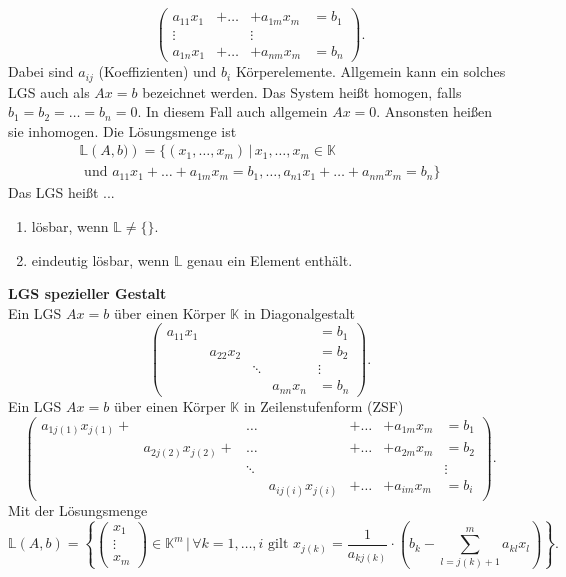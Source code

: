 \documentclass[a4paper,12pt]{article}
\begin{document}
\[ 
        \left(\begin{matrix}
                        a_{11}x_1&+\hdots&+a_{1m}x_m&=b_1\\
                        \vdots&&\vdots\\
                        a_{1n}x_1&+\hdots&+a_{nm}x_m&=b_n
        \end{matrix}\right)
.\] 
Dabei sind $a_{ij}$ (Koeffizienten) und $b_i$ Körperelemente. Allgemein kann ein solches LGS auch als $Ax=b$ bezeichnet werden. Das System heißt homogen, falls $b_1=b_2=\hdots=b_n=0$. In diesem Fall auch allgemein $Ax=0$. Ansonsten heißen sie inhomogen. Die Lösungsmenge ist
\begin{gather*}
        \mathbb{L}\left(A,b)\right)=\{\left(x_1,\hdots,x_m\right)\,|\, x_1,\hdots,x_m \in \mathbb{K}\\\text{ und }a_{11}x_1+\hdots+a_{1m}x_m=b_1,\hdots,a_{n1}x_1+\hdots+a_{nm}x_m=b_n\}
\end{gather*}
Das LGS heißt ...
\begin{enumerate}[label=...]
        \item lösbar, wenn $\mathbb{L}\neq \{\}$.
        \item eindeutig lösbar, wenn $\mathbb{L}$ genau ein Element enthält.
\end{enumerate}
\textbf{LGS spezieller Gestalt}\\
Ein LGS $Ax=b$ über einen Körper $\mathbb{K}$ in Diagonalgestalt
\[ 
        \left(\begin{matrix}
                        a_{11}x_1&&&&=b_1\\
                                 &a_{22}x_2&&&=b_2\\
                                 &&\ddots&&\vdots\\
                                 &&&a_{nn}x_n&=b_n
        \end{matrix}\right)
.\] 
Ein LGS $Ax=b$ über einen Körper $\mathbb{K}$ in Zeilenstufenform (ZSF)
\[ 
        \left(\begin{matrix}
                        a_{1j\left(1\right)}x_{j\left(1\right)}+&&\hdots&&+\hdots&+a_{1m}x_m&=b_1\\
                                                               &a_{2j\left(2\right)}x_{j\left(2\right)}+&\hdots&&+\hdots&+a_{2m}x_m&=b_2\\
                                                               &&\ddots&&&&\vdots\\
                                                               &&&a_{ij\left(i\right)}x_{j\left(i\right)}&+\hdots&+a_{im}x_m&=b_i
        \end{matrix}\right)
.\] 
Mit der Lösungsmenge
\[ 
        \mathbb{L}\left(A,b\right)=\left\{\left(\begin{matrix}
                x_1\\\vdots\\x_m
\end{matrix}\right) \in \mathbb{K}^m\,|\, \forall k=1,\hdots,i\text{ gilt }x_{j\left(k\right)}=\dfrac{1}{a_{kj\left(k\right)}}\cdot \left(b_k-\sum_{l=j\left(k\right)+1}^{m}a_{kl}x_l\right)\right\}
.\] 
\end{document}
